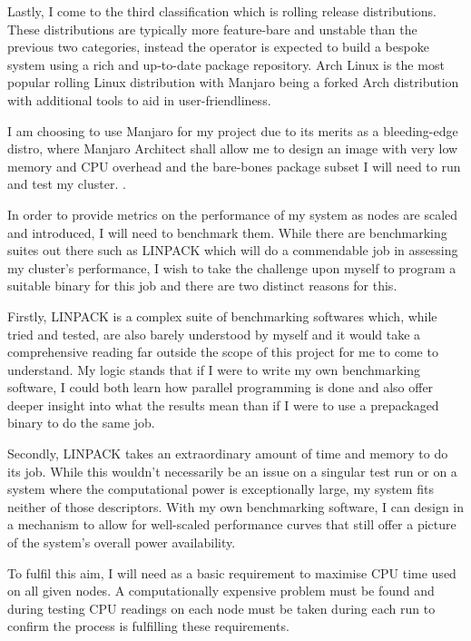 Lastly, I come to the third classification which is rolling release distributions. These distributions are typically more feature-bare and unstable than the previous two categories, instead the operator is expected to build a bespoke system using a rich and up-to-date package repository. Arch Linux is the most popular rolling Linux distribution with Manjaro being a forked Arch distribution with additional tools to aid in user-friendliness.

I am choosing to use Manjaro for my project due to its merits as a bleeding-edge distro, where Manjaro Architect shall allow me to design an image with very low memory and CPU overhead and the bare-bones package subset I will need to run and test my cluster. \cite{manjaro_2020}.

\textbf{}

In order to provide metrics on the performance of my system as nodes are scaled and introduced, I will need to benchmark them. While there are benchmarking suites out there such as LINPACK \cite{dongarra_1979} which will do a commendable job in assessing my cluster's performance, I wish to take the challenge upon myself to program a suitable binary for this job and there are two distinct reasons for this.

Firstly, LINPACK is a complex suite of benchmarking softwares which, while tried and tested, are also barely understood by myself and it would take a comprehensive reading far outside the scope of this project for me to come to understand. My logic stands that if I were to write my own benchmarking software, I could both learn how parallel programming is done and also offer deeper insight into what the results mean than if I were to use a prepackaged binary to do the same job.

Secondly, LINPACK takes an extraordinary amount of time and memory to do its job. While this wouldn't necessarily be an issue on a singular test run or on a system where the computational power is exceptionally large, my system fits neither of those descriptors. With my own benchmarking software, I can design in a mechanism to allow for well-scaled performance curves that still offer a picture of the system's overall power availability.

To fulfil this aim, I will need as a basic requirement to maximise CPU time used on all given nodes. A computationally expensive problem must be found and during testing CPU readings on each node must be taken during each run to confirm the process is fulfilling these requirements.

